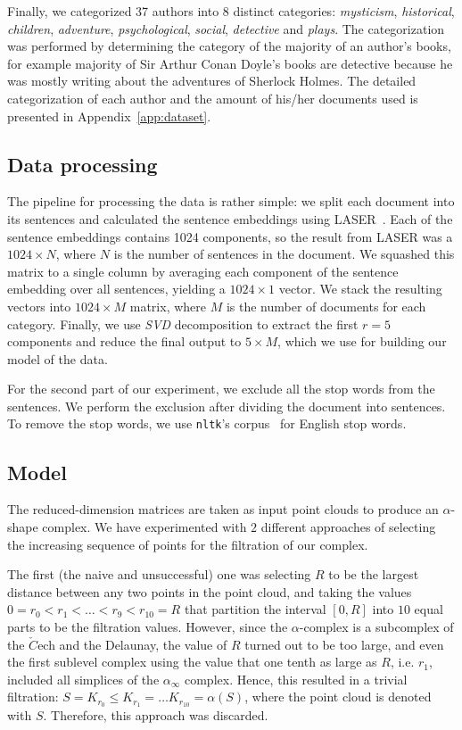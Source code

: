 \documentclass[fleqn]{article}
\begin{document}
Finally, we categorized 37 authors into 8 distinct categories: \textit{mysticism}, \textit{historical}, \textit{children}, \textit{adventure}, \textit{psychological}, \textit{social}, \textit{detective} and \textit{plays}. The categorization was performed by determining the category of the majority of an author's books, for example majority of Sir Arthur Conan Doyle's books are detective because he was mostly writing about the adventures of Sherlock Holmes. The detailed categorization of each author and the amount of his/her documents used is presented in Appendix~\ref{app:dataset}.

\subsection{Data processing} \label{preprocess}
The pipeline for processing the data is rather simple: we split each document into its sentences and calculated the sentence embeddings using LASER~\cite{artetxe2018massively}. Each of the sentence embeddings contains 1024 components, so the result from LASER was a $1024\times N$, where $N$ is the number of sentences in the document. We squashed this matrix to a single column by averaging each component of the sentence embedding over all sentences, yielding a $1024\times1$ vector. We stack the resulting vectors into $1024\times M$ matrix, where $M$ is the number of documents for each category. Finally, we use \textit{SVD} decomposition to extract the first $r = 5$ components and reduce the final output to $5 \times M$, which we use for building our model of the data.

For the second part of our experiment, we exclude all the stop words from the sentences. We perform the exclusion after dividing the document into sentences. To remove the stop words, we use \texttt{nltk}'s corpus~\cite{Loper02nltk:the} for English stop words.

\subsection{Model} \label{model}
The reduced-dimension matrices are taken as input point clouds to produce an $\alpha$-shape complex. We have experimented with $2$ different approaches of selecting the increasing sequence of points for the filtration of our complex.

The first (the naive and unsuccessful) one was selecting $R$ to be the largest distance between any two points in the point cloud, and taking the values $0=r_0 < r_1 < \dots < r_9 < r_{10} = R$ that partition the interval $[0,R]$ into $10$ equal parts to be the filtration values. However, since the $\alpha$-complex is a subcomplex of the $\check{C}$ech and the Delaunay, the value of $R$ turned out to be too large, and even the first sublevel complex using the value that one tenth as large as $R$, i.e. $r_1$, included all simplices of the $\alpha_\infty$ complex. Hence, this resulted in a trivial filtration: $S = K_{r_0} \leq K_{r_1} = \dots K_{r_{10}} = \alpha(S)$, where the point cloud is denoted with $S$. Therefore, this approach was discarded.
\end{document}
